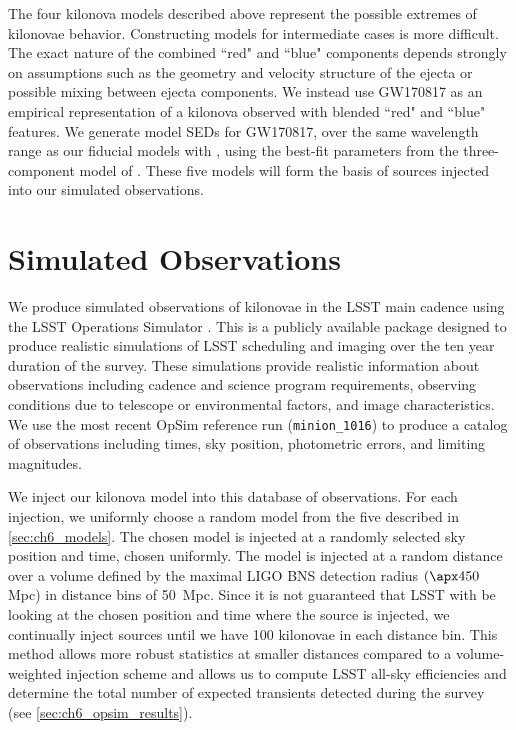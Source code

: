 The four kilonova models described above represent the possible extremes of kilonovae behavior. Constructing models for intermediate cases is more difficult. The exact nature of the combined ``red" and ``blue" components depends strongly on assumptions such as the geometry and velocity structure of the ejecta or possible mixing between ejecta components. We instead use GW170817 as an empirical representation of a kilonova observed with blended ``red" and ``blue" features. We generate model SEDs for GW170817, over the same wavelength range as our fiducial models with \mosfit, using the best-fit parameters from the three-component model of \citep{Villar+17b}. These five models will form the basis of sources injected into our simulated observations.

\clearpage
\section{Simulated Observations}
\label{sec:ch6_obs}

%

We produce simulated observations of kilonovae in the LSST main cadence using the LSST Operations Simulator \citep[OpSim,][]{OpSim1,OpSim2}. This is a publicly available package designed to produce realistic simulations of LSST scheduling and imaging over the ten year duration of the survey. These simulations provide realistic information about observations including cadence and science program requirements, observing conditions due to telescope or environmental factors, and image characteristics. We use the most recent OpSim reference run ({\tt minion\_1016}) to produce a catalog of observations including times, sky position, photometric errors, and limiting magnitudes.

We inject our kilonova model into this database of observations. For each injection, we uniformly choose a random model from the five described in \cref{sec:ch6_models}. The chosen model is injected at a randomly selected sky position and time, chosen uniformly. The model is injected at a random  
distance over a volume defined by the maximal LIGO BNS detection radius $(\apx450$ Mpc) in distance bins of 50~Mpc. Since it is not guaranteed that LSST with be looking at the chosen position and time where the source is injected, we continually inject sources until we have 100 kilonovae in each distance bin. This method allows more robust statistics at smaller distances compared to a volume-weighted injection scheme and allows us to compute LSST all-sky efficiencies and determine the total number of expected transients detected during the survey (see \cref{sec:ch6_opsim_results}).

